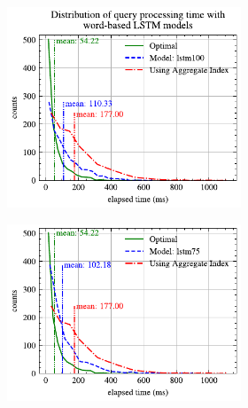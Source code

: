 \begin{figure}[!th]
	\centering
	\begin{subfigure}{0.45\textwidth}
		\begin{subfigure}{\textwidth}
			\centering
%			
			\includegraphics[]{my/graphics/perf_dist_lstm100_B.pdf}
		\end{subfigure}
		\vfill
		\begin{subfigure}{\textwidth}
			\centering
			\includegraphics[]{my/graphics/perf_dist_lstm75_B.pdf}
		\end{subfigure}
		\vfill
		\begin{subfigure}{\textwidth}
			\centering

\end{subfigure}
\end{subfigure}
\end{figure}
